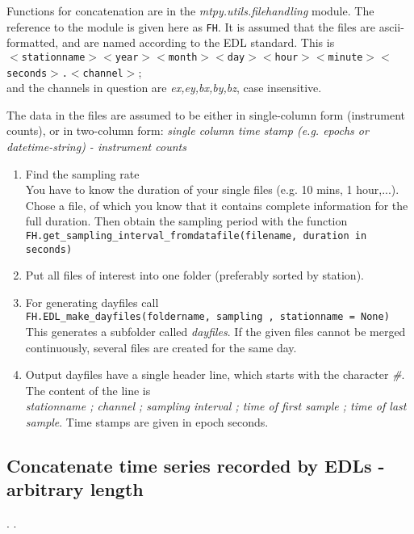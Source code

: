 Functions for concatenation are in the \textit{mtpy.utils.filehandling} module. The reference to the module is given here as   \texttt{FH}. It is assumed that the files are ascii-formatted, and are named according to the EDL standard. This is\\ \texttt{$<$stationname$>$$<$year$>$$<$month$>$$<$day$>$$<$hour$>$$<$minute$>$$<$seconds$>$.$<$channel$>$};\\ and the channels in question are \textit{ex,ey,bx,by,bz}, case insensitive.

The data in the files are assumed to be either in single-column form (instrument counts), or in two-column form: \textit{single column time stamp (e.g. epochs or datetime-string) - instrument counts}

\begin{enumerate}
\item Find the sampling rate{~}\\
You have to know the duration of your single files (e.g. 10 mins, 1 hour,...). Chose a file, of which you know that it contains complete information for the full duration. Then obtain the sampling period with the function \\
\texttt{FH.get\_sampling\_interval\_fromdatafile(filename, duration in seconds)}

\item Put all files of interest into one folder (preferably sorted by station).

\item For generating dayfiles call \\
\texttt{FH.EDL\_make\_dayfiles(foldername, sampling , stationname = None)}\\ This generates a subfolder called \textit{dayfiles}. If the given files cannot be merged continuously, several files are created for the same day.

\item Output dayfiles have a single header line, which starts with the character \textit{\#}. The content of the line is \\  \textit{stationname ; channel ; sampling interval ; time of first sample ; time of last sample}. Time stamps are given in epoch seconds.

\end{enumerate}

\subsection{Concatenate time series recorded by EDLs - arbitrary length}
.
.

